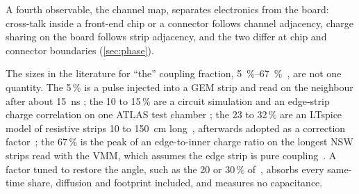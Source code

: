 A fourth observable, the channel map, separates electronics from the board: cross-talk inside a front-end chip or a connector
follows channel adjacency, charge sharing on the board follows strip adjacency, and the two differ at chip and connector
boundaries (\cref{sec:phase}).

The sizes in the literature for ``the'' coupling fraction, \SIrange{5}{67}{\%}~\cite{Farinelli2019,Ntekas2016,Loesel2017,Scholer2021},
are not one quantity. The 5\,\% is a pulse injected into a GEM strip and read on the neighbour after about \SI{15}{ns}
\cite{Farinelli2019}; the 10 to 15\,\% are a circuit simulation and an edge-strip charge correlation on one ATLAS test chamber
\cite{Ntekas2016}; the 23 to 32\,\% are an LTspice model of resistive strips 10 to 150~cm long~\cite{Loesel2017}, afterwards
adopted as a correction factor~\cite{Flierl2018,Herrmann2019}; the 67\,\% is the peak of an edge-to-inner charge ratio on the
longest NSW strips read with the VMM, which assumes the edge strip is pure coupling~\cite{Scholer2021}. A factor tuned to
restore the angle, such as the 20 or 30\,\% of~\cite{Flierl2018,Herrmann2019}, absorbs every same-time share, diffusion and
footprint included, and measures no capacitance.
